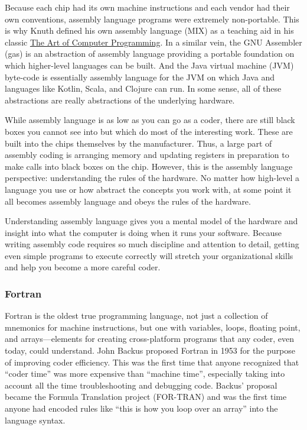 Because each chip had its own machine instructions and each vendor had their
own conventions, assembly language programs were extremely non-portable. This
is why Knuth defined his own assembly language (MIX) as a teaching aid in his
classic \underline{The Art of Computer Programming}. In a similar vein, the GNU
Assembler (gas) is an abstraction of assembly language providing a portable
foundation on which higher-level languages can be built. And the Java virtual
machine (JVM) byte-code is essentially assembly language for the JVM on which
Java and languages like Kotlin, Scala, and Clojure can run. In some sense, all
of these abstractions are really abstractions of the underlying hardware.

While assembly language is as low as you can go as a coder, there are still
black boxes you cannot see into but which do most of the interesting work.
These are built into the chips themselves by the manufacturer. Thus, a large
part of assembly coding is arranging memory and updating registers in
preparation to make calls into black boxes on the chip. However, this is the
assembly language perspective: understanding the rules of the hardware. No
matter how high-level a language you use or how abstract the concepts you work
with, at some point it all becomes assembly language and obeys the rules of the
hardware.

Understanding assembly language gives you a mental model of the hardware and
insight into what the computer is doing when it runs your software. Because
writing assembly code requires so much discipline and attention to detail,
getting even simple programs to execute correctly will stretch your
organizational skills and help you become a more careful coder.


\subsubsection{Fortran}

Fortran is the oldest true programming language, not just a collection of
mnemonics for machine instructions, but one with variables, loops, floating
point, and arrays---elements for creating cross-platform programs that any
coder, even today, could understand. John Backus proposed Fortran in 1953 for
the purpose of improving coder efficiency. This was the first time that anyone
recognized that ``coder time'' was more expensive than ``machine time'',
especially taking into account all the time troubleshooting and debugging code.
Backus' proposal became the Formula Translation project (FOR-TRAN) and was the
first time anyone had encoded rules like ``this is how you loop over an array''
into the language syntax.

